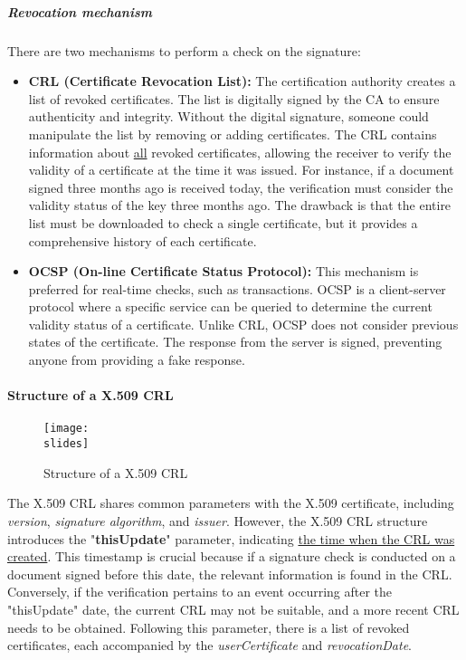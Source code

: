 \subparagraph{Revocation mechanism}
There are two mechanisms to perform a check on the signature:

\begin{itemize}
    \item \textbf{CRL (Certificate Revocation List):} The certification authority creates a list of revoked certificates. The list is digitally signed by the CA to ensure authenticity and integrity. Without the digital signature, someone could manipulate the list by removing or adding certificates. The CRL contains information about \underline{all} revoked certificates, allowing the receiver to verify the validity of a certificate at the time it was issued. For instance, if a document signed three months ago is received today, the verification must consider the validity status of the key three months ago. The drawback is that the entire list must be downloaded to check a single certificate, but it provides a comprehensive history of each certificate.

    \item \textbf{OCSP (On-line Certificate Status Protocol):} This mechanism is preferred for real-time checks, such as transactions. OCSP is a client-server protocol where a specific service can be queried to determine the current validity status of a certificate. Unlike CRL, OCSP does not consider previous states of the certificate. The response from the server is signed, preventing anyone from providing a fake response.
\end{itemize}



\paragraph{Structure of a X.509 CRL}
\begin{figure}[h]
    \centering
    \texttt{[image: \\slides]}
    \caption{Structure of a X.509 CRL}
\end{figure}

The X.509 CRL shares common parameters with the X.509 certificate, including \textit{version}, \textit{signature algorithm}, and \textit{issuer}.
However, the X.509 CRL structure introduces the "\textbf{thisUpdate}" parameter, indicating \underline{the time when the CRL was created}. 
This timestamp is crucial because if a signature check is conducted on a document signed before this date, the relevant information is found in the CRL. Conversely, if the verification pertains to an event occurring after the "thisUpdate" date, the current CRL may not be suitable, and a more recent CRL needs to be obtained. Following this parameter, there is a list of revoked certificates, each accompanied by the \textit{userCertificate} and \textit{revocationDate}.



